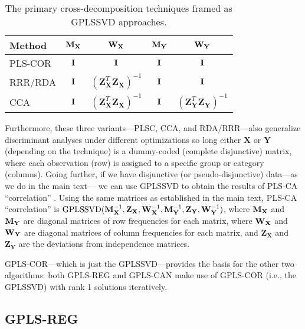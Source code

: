 \documentclass[12pt]{article}
\begin{document}
\begin{table}
\centering
\begin{tabular}{ l  c  c  c  c }
  Method & ${\bf M}_{\bf X}$ & ${\bf W}_{\bf X}$ & ${\bf M}_{\bf Y}$ & ${\bf W}_{\bf Y}$ \\
  \hline            
  PLS-COR & ${\bf I}$ & ${\bf I}$ & ${\bf I}$ & ${\bf I}$ \\
  RRR/RDA & ${\bf I}$ & $({\mathbf Z}_{\mathbf X}^{T}{\mathbf Z}_{\mathbf X})^{-1}$ & ${\bf I}$ & ${\bf I}$ \\
  CCA & ${\bf I}$ & $({\mathbf Z}_{\mathbf X}^{T}{\mathbf Z}_{\mathbf X})^{-1}$ & ${\bf I}$ & $({\mathbf Z}_{\mathbf Y}^{T}{\mathbf Z}_{\mathbf Y})^{-1}$ \\
  \hline  
\end{tabular}
\caption{The primary cross-decomposition techniques framed as GPLSSVD approaches.}\label{table:crossdecomp}
\end{table}

Furthermore, these three variants---PLSC, CCA, and RDA/RRR---also
generalize discriminant analyses under different optimizations so long
either \({\mathbf X}\) or \({\mathbf Y}\) (depending on the technique)
is a dummy-coded (complete disjunctive) matrix, where each observation
(row) is assigned to a specific group or category (columns). Going
further, if we have disjunctive (or pseudo-disjunctive) data---as we do
in the main text--- we can use GPLSSVD to obtain the results of PLS-CA
``correlation'' \citep{beaton_partial_2016}. Using the same matrices as
established in the main text, PLS-CA ``correlation'' is
\(\mathrm{GPLSSVD(} {\mathbf M}_{\bf X}^{-1}, {\mathbf Z}_{{\mathbf X}}, {\mathbf W}_{\bf X}^{-1}, {\mathbf M}_{\bf Y}^{-1}, {\mathbf Z}_{{\mathbf Y}}, {\mathbf W}_{\bf Y}^{-1}\mathrm{)}\),
where \({\mathbf M}_{\bf X}\) and \({\mathbf M}_{\bf Y}\) are diagonal
matrices of row frequencies for each matrix, where
\({\mathbf W}_{\bf X}\) and \({\mathbf W}_{\bf Y}\) are diagonal
matrices of column frequencies for each matrix, and
\({\mathbf Z}_{{\mathbf X}}\) and \({\mathbf Z}_{{\mathbf Y}}\) are the
deviations from independence matrices.

GPLS-COR---which is just the GPLSSVD---provides the basis for the other
two algorithms: both GPLS-REG and GPLS-CAN make use of GPLS-COR (i.e.,
the GPLSSVD) with rank 1 solutions iteratively.

\hypertarget{gpls-reg}{%
\subsection{GPLS-REG}\label{gpls-reg}}
\end{document}
